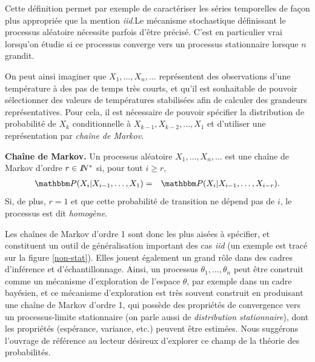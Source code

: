 Cette d\'efinition permet par exemple de caract\'eriser les s\'eries temporelles de fa\c con plus appropri\'ee que la mention {\it iid}.Le m\'ecanisme stochastique d\'efinissant le processus al\'eatoire n\'ecessite parfois d'\^etre pr\'ecis\'e. C'est en particulier vrai lorsqu'on \'etudie si ce processus converge vers un processus stationnaire lorsque $n$ grandit. 

On peut ainsi imaginer que $X_1,\ldots,X_n,\ldots$ repr\'esentent des observations d'une temp\'erature \`a des pas de temps tr\`es courts, et qu'il est souhaitable de pouvoir s\'electionner des valeurs de temp\'eratures stabilis\'ees afin de calculer des grandeurs repr\'esentatives. Pour cela, il est n\'ecessaire de pouvoir sp\'ecifier la distribution de probabilit\'e de $X_k$ conditionnelle \`a $X_{k-1},X_{k-2},\ldots, X_1$ et d'utiliser une repr\'esentation par {\it cha\^ine de Markov}.  \\

\begin{definition}{\bf Cha\^ine de Markov.}\label{markov.chain}
Un processus al\'eatoire $X_1,\ldots,X_n,\ldots$ est une cha\^ine de Markov d'ordre $r\in I\!\!N^*$ si, pour tout $i\geq r$,
\begin{eqnarray*}
\Pm(X_i|X_{i-1},\ldots,X_1) & = & \Pm(X_i|X_{i-1},\ldots,X_{i-r}).
\end{eqnarray*}
Si, de plus,  $r=1$ et que cette probabilit\'e de transition ne d\'epend pas de $i$, le processus est dit {\it homog\`ene}. \\
\end{definition}



Les cha\^ines de Markov d'ordre 1 sont donc les plus ais\'ees \`a sp\'ecifier, et constituent un outil de g\'en\'eralisation important des cas {\it iid} (un exemple est trac\'e sur la figure \ref{non-stat}).   
Elles jouent \'egalement un grand r\^ole dans des cadres d'inf\'erence et d'\'echantillonnage. Ainsi, un processus $\theta_1,\ldots,\theta_n$ peut \^etre construit comme un m\'ecanisme d'exploration de l'espace $\theta$, par exemple dans un cadre bay\'esien, et ce m\'ecanisme d'exploration est tr\`es souvent construit en produisant une cha\^ine de Markov d'ordre 1, qui poss\`ede des propri\'et\'es de convergence vers un processus-limite stationnaire (on parle aussi de {\it distribution stationnaire}), dont les propri\'et\'es (esp\'erance, variance, etc.) peuvent \^etre estim\'ees. Nous sugg\'erons l'ouvrage de r\'ef\'erence \cite{Robert2004} au lecteur d\'esireux d'explorer ce champ de la th\'eorie des probabilit\'es. \\     

